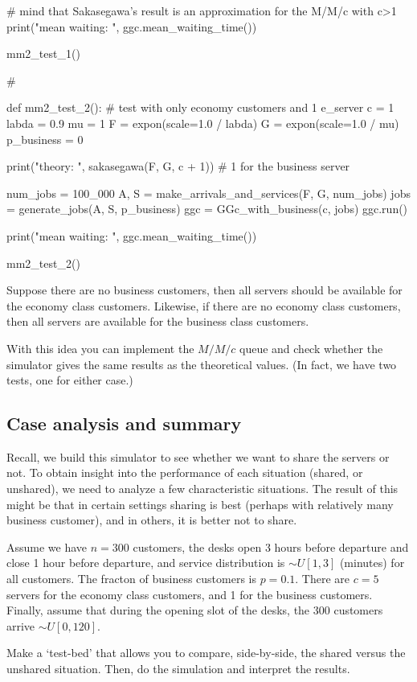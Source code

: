 \begin{exercise}
\begin{solution}
\begin{pyverbatim}
    # mind that Sakasegawa's result is an approximation for the M/M/c with c>1
    print("mean waiting: ", ggc.mean_waiting_time())


mm2_test_1()


# %


def mm2_test_2():
    # test with only economy customers and 1 e_server
    c = 1
    labda = 0.9
    mu = 1
    F = expon(scale=1.0 / labda)
    G = expon(scale=1.0 / mu)
    p_business = 0

    print("theory: ", sakasegawa(F, G, c + 1))  # 1 for the business server

    num_jobs = 100_000
    A, S = make_arrivals_and_services(F, G, num_jobs)
    jobs = generate_jobs(A, S, p_business)
    ggc = GGc_with_business(c, jobs)
    ggc.run()

    print("mean waiting: ", ggc.mean_waiting_time())


mm2_test_2()
\end{pyverbatim}
    
\end{solution}

\end{exercise}

\begin{exercise}
  Suppose there are no business customers, then all servers should be available for the economy class customers.
  Likewise, if there are no economy class customers, then all servers are available for the business class customers.

  With this idea you can implement the $M/M/c$ queue and check whether the simulator gives the same results as the theoretical values. (In fact, we have two tests, one for either case.)
\end{exercise}

\subsection{Case analysis and summary}
\label{sec:cases}

Recall, we build this simulator to see whether we want to share the servers or not.
To obtain insight into the performance of each situation (shared, or unshared), we need to analyze a few characteristic situations.
The result of this might be that in certain settings sharing is best (perhaps with relatively many business customer), and in others, it is better not to share.

\begin{exercise}
  Assume we have $n=300$ customers, the desks open 3 hours before departure and close 1 hour before departure, and service distribution is $\sim U[1,3]$ (minutes) for all customers.
  The fracton of business customers is $p=0.1$.
  There are $c=5$ servers for the economy class customers, and 1 for the business customers.
  Finally, assume that during the opening slot of the desks, the 300 customers arrive $\sim U[0, 120]$.

Make a `test-bed' that allows you to compare, side-by-side, the shared versus the unshared situation. Then, do the simulation and interpret the results.
\end{exercise}

